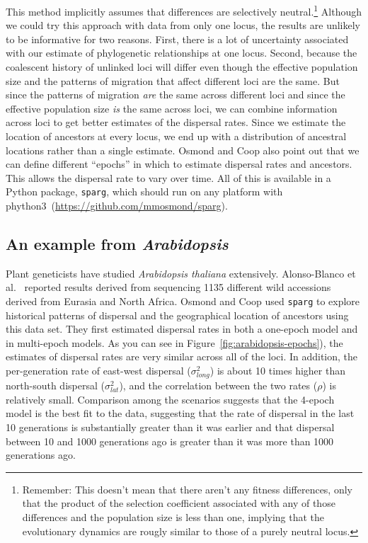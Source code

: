 This method implicitly assumes that differences are selectively
neutral.\footnote{Remember: This doesn't mean that there aren't any
  fitness differences, only that the product of the selection
  coefficient associated with any of those differences and the
  population size is less than one, implying that the evolutionary
  dynamics are rougly similar to those of a purely neutral locus.}
Although we could try this approach with data from only one locus, the
results are unlikely to be informative for two reasons. First, there
is a lot of uncertainty associated with our estimate of phylogenetic
relationships at one locus. Second, because the coalescent history of
unlinked loci will differ even though the effective population size
and the patterns of migration that affect different loci are the
same. But since the patterns of migration {\it are\/} the same across
different loci and since the effective population size {\it is\/} the
same across loci, we can combine information across loci to get better
estimates of the dispersal rates. Since we estimate the location of
ancestors at every locus, we end up with a distribution of ancestral
locations rather than a single estimate. Osmond and Coop also point
out that we can define different ``epochs'' in which to estimate
dispersal rates and ancestors. This allows the dispersal rate to vary
over time. All of this is available in a Python package, {\tt sparg},
which should run on any platform with
phython3~(\url{https://github.com/mmosmond/sparg}).

\subsection*{An example from {\it Arabidopsis}} 

Plant geneticists have studied {\it Arabidopsis thaliana\/}
extensively. Alonso-Blanco et al.~\cite{AlonsoBlanco-etal-2016}
reported results derived from sequencing 1135 different wild
accessions derived from Eurasia and North Africa. Osmond and Coop used
{\tt sparg} to explore historical patterns of dispersal and the
geographical location of ancestors using this data set. They first
estimated dispersal rates in both a one-epoch model and in multi-epoch
models. As you can see in Figure~\ref{fig:arabidopsis-epochs}), the
estimates of dispersal rates are very similar across all of the
loci. In addition, the per-generation rate of east-west dispersal
($\sigma^2_{long}$) is about 10 times higher than north-south
dispersal ($\sigma^2_{lat}$), and the correlation between the two
rates ($\rho$) is relatively small. Comparison among the scenarios
suggests that the 4-epoch model is the best fit to the data,
suggesting that the rate of dispersal in the last 10 generations is
substantially greater than it was earlier and that dispersal between
10 and 1000 generations ago is greater than it was more than 1000
generations ago.

